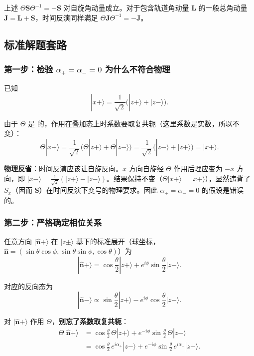 \begin{tipbox}[补充说明]
上述 $\Theta \bm{S} \Theta^{-1} = -\bm{S}$ 对自旋角动量成立。对于包含轨道角动量 $\bm{L}$ 的一般总角动量 $\bm{J} = \bm{L} + \bm{S}$，时间反演同样满足 $\Theta \bm{J} \Theta^{-1} = -\bm{J}$。
\end{tipbox}

\subsection{标准解题套路}

\subsubsection[检验 alpha+ = alpha- = 0 为什么不符合物理]{第一步：检验 $\alpha_+ = \alpha_- = 0$ 为什么不符合物理}

已知
\[
|x+\rangle = \frac{1}{\sqrt{2}}\bigl(|z+\rangle + |z-\rangle\bigr).
\]

由于 $\Theta$ 是 的，作用在叠加态上时系数要取复共轭（这里系数是实数，所以不变）：
\[
\Theta |x+\rangle = \frac{1}{\sqrt{2}}\bigl(\Theta|z+\rangle + \Theta|z-\rangle\bigr)
= \frac{1}{\sqrt{2}}\bigl(|z-\rangle + |z+\rangle\bigr) = |x+\rangle.
\]

\textbf{物理反省}：时间反演应该让自旋反向。$x$ 方向自旋经 $\Theta$ 作用后理应变为 $-x$ 方向，即 $|x-\rangle = \frac{1}{\sqrt{2}}(|z+\rangle - |z-\rangle)$。结果保持不变（$\Theta|x+\rangle = |x+\rangle$），显然违背了 $S_x$（因而 $\bm{S}$）在时间反演下变号的物理要求。因此 $\alpha_+ = \alpha_- = 0$ 的假设是错误的。

\subsubsection{第二步：严格确定相位关系}

任意方向 $|\hat{\bm{n}}+\rangle$ 在 $|z\pm\rangle$ 基下的标准展开（球坐标，$\hat{\bm{n}} = (\sin\theta\cos\phi, \sin\theta\sin\phi, \cos\theta)$）为
\[
|\hat{\bm{n}}+\rangle = \cos\frac{\theta}{2} |z+\rangle + e^{i\phi} \sin\frac{\theta}{2} |z-\rangle.
\]

对应的反向态为
\[
|\hat{\bm{n}}-\rangle \propto \sin\frac{\theta}{2} |z+\rangle - e^{i\phi} \cos\frac{\theta}{2} |z-\rangle.
\]

对 $|\hat{\bm{n}}+\rangle$ 作用 $\Theta$，\textbf{别忘了系数取复共轭}：
\begin{align*}
\Theta |\hat{\bm{n}}+\rangle
&= \cos\frac{\theta}{2} \, \Theta|z+\rangle + e^{-i\phi} \sin\frac{\theta}{2} \, \Theta|z-\rangle \\
&= \cos\frac{\theta}{2} \, e^{i\alpha_+} |z-\rangle + e^{-i\phi} \sin\frac{\theta}{2} \, e^{i\alpha_-} |z+\rangle.
\end{align*}

